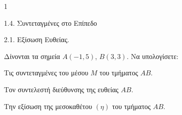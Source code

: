 \begin{ylh}{1}
    \item 1.4. Συντεταγμένες στο Επίπεδο
    \item 2.1. Εξίσωση Ευθείας.
\end{ylh}
Δίνονται τα σημεία $A(-1,5)$, $B(3,3)$. Να υπολογίσετε:
\begin{alist}
    \item Τις συντεταγμένες του μέσου $M$ του τμήματος $AB$. 
    \item Τον συντελεστή διεύθυνσης της ευθείας $AB$. 
    \item Την εξίσωση της μεσοκαθέτου $(\eta)$ του τμήματος $AB$. 
\end{alist}